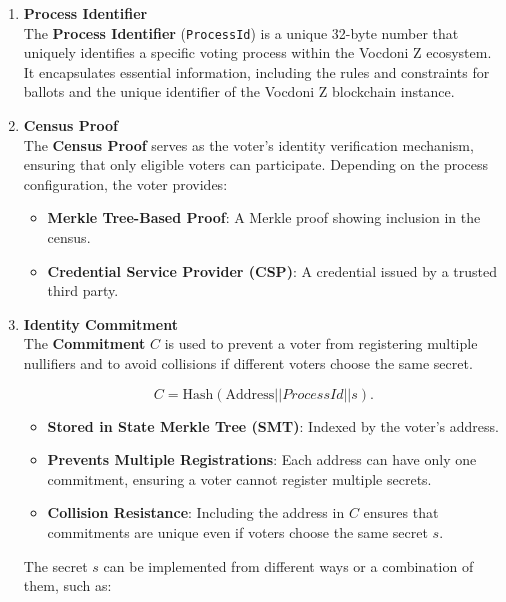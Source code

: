 \begin{enumerate}
	\item \textbf{Process Identifier} \\
	
			The \textbf{Process Identifier} (\texttt{ProcessId}) is a unique 32-byte number that uniquely identifies a specific voting process within the Vocdoni Z ecosystem. It encapsulates essential information, including the rules and constraints for ballots and the unique identifier of the Vocdoni Z blockchain instance.\\
			
	\item \textbf{Census Proof} \\
			
			The \textbf{Census Proof} serves as the voter's identity verification mechanism, ensuring that only eligible voters can participate. Depending on the process configuration, the voter provides:
			\begin{itemize}
				\item \textbf{Merkle Tree-Based Proof}: A Merkle proof showing inclusion in the census.
				\item \textbf{Credential Service Provider (CSP)}: A credential issued by a trusted third party. \\
			\end{itemize}
			
	\item \textbf{Identity Commitment}\\
	
			The \textbf{Commitment} $C$ is used to prevent a voter from registering multiple nullifiers and to avoid collisions if different voters choose the same secret.
			
			$$ C = \text{Hash} (\text{Address} || ProcessId || s). $$
			
			\begin{itemize}
				\item \textbf{Stored in State Merkle Tree (SMT)}: Indexed by the voter's address.
				\item \textbf{Prevents Multiple Registrations}: Each address can have only one commitment, ensuring a voter cannot register multiple secrets.
				\item \textbf{Collision Resistance}: Including the address in $C$ ensures that commitments are unique even if voters choose the same secret $s$.
			\end{itemize}
			
			The secret $s$ can be implemented from different ways or a combination of them, such as:
			

\end{enumerate}

